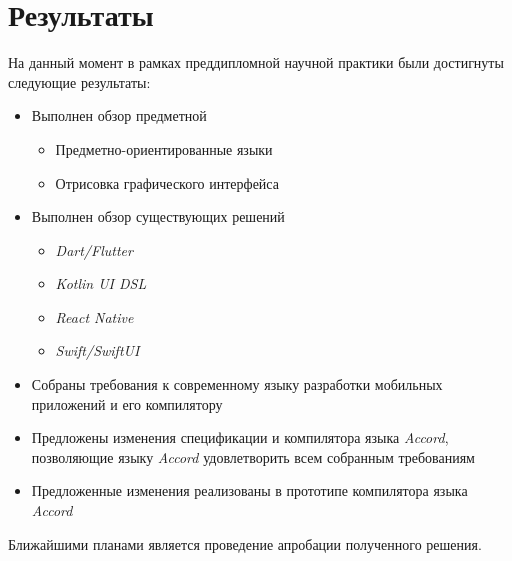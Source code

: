 \section{Результаты}
На данный момент в рамках преддипломной научной практики были достигнуты
следующие результаты:
\begin{itemize}
	\item Выполнен обзор предметной
		\begin{itemize}
			\item Предметно-ориентированные языки
			\item Отрисовка графического интерфейса
		\end{itemize}
	\item Выполнен обзор существующих решений
		\begin{itemize}
			\item \textit{Dart/Flutter}
			\item \textit{Kotlin UI DSL}
			\item \textit{React Native}
			\item \textit{Swift/SwiftUI}
		\end{itemize}
	\item Собраны требования к современному языку разработки мобильных
	приложений и его компилятору
	\item Предложены изменения спецификации и компилятора языка
	\textit{Accord}, позволяющие языку \textit{Accord} удовлетворить
	всем собранным требованиям
	\item Предложенные изменения реализованы в прототипе компилятора
	языка \textit{Accord}
\end{itemize}

Ближайшими планами является проведение апробации полученного решения.
